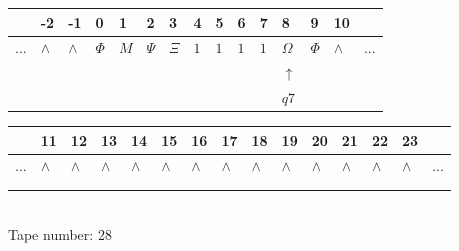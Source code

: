 \documentclass[11pt]{article}
\begin{document}
\begin{table}[H]
\centering
\begin{tabular}{lllllllllllllll}
 & -2 & -1 & 0 & 1 & 2 & 3 & 4 & 5 & 6 & 7 & 8 & 9 & 10 & \\
\hline
$...$ & \multicolumn{1}{|l|}{$\wedge$} & \multicolumn{1}{|l|}{$\wedge$} & \multicolumn{1}{|l|}{$\Phi$} & \multicolumn{1}{|l|}{$M$} & \multicolumn{1}{|l|}{$\Psi$} & \multicolumn{1}{|l|}{$\Xi$} & \multicolumn{1}{|l|}{$1$} & \multicolumn{1}{|l|}{$1$} & \multicolumn{1}{|l|}{$1$} & \multicolumn{1}{|l|}{$1$} & \multicolumn{1}{|l|}{$\Omega$} & \multicolumn{1}{|l|}{$\Phi$} & \multicolumn{1}{|l|}{$\wedge$} & $...$\\
\hline
&  &  &  &  &  &  &  &  &  &  & $\uparrow$ &  &  &  \\
&  &  &  &  &  &  &  &  &  &  & $ q7 $ &  &  &  \\
\end{tabular}
\begin{tabular}{lllllllllllllll}
 & 11 & 12 & 13 & 14 & 15 & 16 & 17 & 18 & 19 & 20 & 21 & 22 & 23 & \\
\hline
$...$ & \multicolumn{1}{|l|}{$\wedge$} & \multicolumn{1}{|l|}{$\wedge$} & \multicolumn{1}{|l|}{$\wedge$} & \multicolumn{1}{|l|}{$\wedge$} & \multicolumn{1}{|l|}{$\wedge$} & \multicolumn{1}{|l|}{$\wedge$} & \multicolumn{1}{|l|}{$\wedge$} & \multicolumn{1}{|l|}{$\wedge$} & \multicolumn{1}{|l|}{$\wedge$} & \multicolumn{1}{|l|}{$\wedge$} & \multicolumn{1}{|l|}{$\wedge$} & \multicolumn{1}{|l|}{$\wedge$} & \multicolumn{1}{|l|}{$\wedge$} & $...$\\
\hline
&  &  &  &  &  &  &  &  &  &  &  &  &  &  \\
&  &  &  &  &  &  &  &  &  &  &  &  &  &  \\
\end{tabular}
\\
Tape number: 28
\noindent\makebox[\linewidth]{\hdashrule{\textwidth}{1pt}{1pt}}\end{table}
\end{document}
